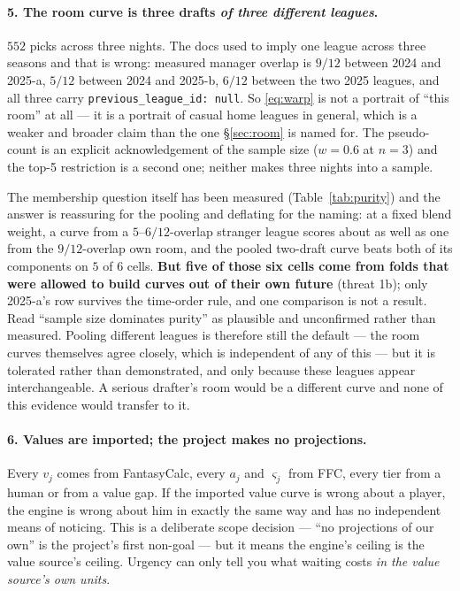 \documentclass[10pt,a4paper]{article}
\theoremstyle{plain}
\theoremstyle{definition}
\theoremstyle{remark}
\newcommand{\code}[1]{\texttt{\small #1}}
\begin{document}
\paragraph{5. The room curve is three drafts \emph{of three different leagues}.}
$552$ picks across three nights. The docs used to imply one league across three seasons and
that is wrong: measured manager overlap is $9/12$ between 2024 and 2025-a, $5/12$ between
2024 and 2025-b, $6/12$ between the two 2025 leagues, and all three carry
\code{previous\_league\_id: null}. So \eqref{eq:warp} is not a portrait of ``this room'' at
all --- it is a portrait of casual home leagues in general, which is a weaker and broader
claim than the one \S\ref{sec:room} is named for. The pseudo-count is an explicit
acknowledgement of the sample size ($w = 0.6$ at $n = 3$) and the top-5 restriction is a
second one; neither makes three nights into a sample.

The membership question itself has been measured (Table~\ref{tab:purity}) and the answer
is reassuring for the pooling and deflating for the naming: at a fixed blend weight, a
curve from a $5$--$6/12$-overlap stranger league scores about as well as one from the
$9/12$-overlap own room, and the pooled two-draft curve beats both of its components on $5$
of $6$ cells. \textbf{But five of those six cells come from folds that were allowed to
build curves out of their own future} (threat 1b); only 2025-a's row survives the
time-order rule, and one comparison is not a result. Read ``sample size dominates purity''
as plausible and unconfirmed rather than measured. Pooling different leagues is therefore
still the default --- the room curves themselves agree closely, which is independent of any
of this --- but it is tolerated rather than demonstrated, and only because these leagues
appear interchangeable. A serious drafter's room would be a different curve and none of
this evidence would transfer to it.

\paragraph{6. Values are imported; the project makes no projections.}
Every $v_j$ comes from FantasyCalc, every $a_j$ and $\varsigma_j$ from FFC, every tier
from a human or from a value gap. If the imported value curve is wrong about a player,
the engine is wrong about him in exactly the same way and has no independent means of
noticing. This is a deliberate scope decision --- ``no projections of our own'' is the
project's first non-goal --- but it means the engine's ceiling is the value source's
ceiling. Urgency can only tell you what waiting costs \emph{in the value source's own
units}.
\end{document}
